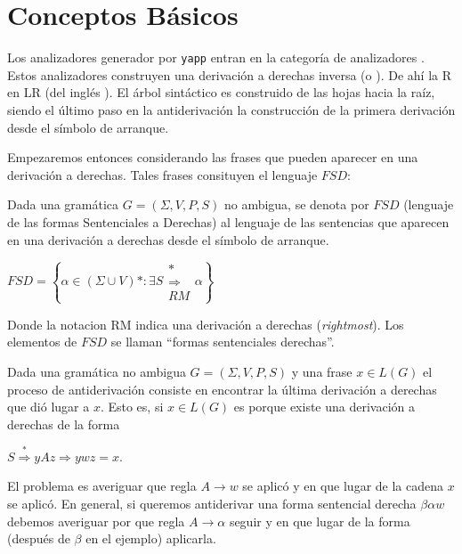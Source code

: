 \section{Conceptos Básicos}
\label{section:conceptosbasicos}
Los analizadores generador por \verb|yapp| entran en la categoría de analizadores
. Estos analizadores construyen una derivación a derechas inversa 
(o ).
De ahí la R en LR (del inglés ). El árbol sintáctico 
es construido de las hojas hacia la raíz, siendo el último paso en la antiderivación
la construcción de la primera derivación desde el símbolo de arranque.

Empezaremos entonces considerando las frases que pueden aparecer en una derivación
a derechas. Tales frases consituyen el lenguaje $FSD$:

\begin{definition}
Dada una gramática $G=(\Sigma,V,P,S)$ no ambigua, se denota por $FSD$ 
(lenguaje de las formas Sentenciales a Derechas) al lenguaje de 
las sentencias que aparecen en una derivación a derechas desde el símbolo de arranque.

\begin{center}
$FSD = \left \{ \alpha \in (\Sigma \cup V)* : \exists S \begin{array}{c} *\\ \Longrightarrow \\ {\scriptstyle RM} \end{array} \alpha \right \}$
\end{center}

Donde la notacion RM indica una derivación a derechas (\emph{rightmost}).
Los elementos de $FSD$ se llaman ``formas sentenciales derechas''.
\end{definition}

Dada una gramática no ambigua $G=(\Sigma,V,P,S)$ y una frase $x \in L(G)$ el proceso
de antiderivación consiste en encontrar la última derivación a derechas que dió lugar a 
$x$. Esto es, si $x \in L(G)$ es porque existe una derivación a derechas de la forma

\begin{center}
$S \stackrel{*}{\Longrightarrow} y A z \Longrightarrow y w z = x$. 
\end{center}

El problema es averiguar que regla $A \rightarrow w$ se aplicó y en que lugar 
de la cadena $x$ se aplicó. En general, si queremos antiderivar
una forma sentencial derecha $\beta \alpha w$ 
debemos averiguar por que regla $A \rightarrow \alpha$
seguir y en que lugar de la forma (después de $\beta$ en el ejemplo)
aplicarla. 


